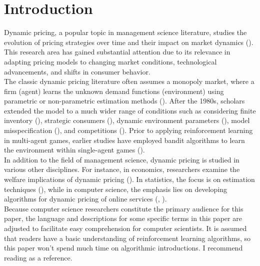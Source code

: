 \documentclass[12pt]{article}
\begin{document}
\section{Introduction}

Dynamic pricing, a popular topic in management science literature, studies the evolution of pricing strategies over time and their impact on market dynamics (\cite{den2015dynamic}). This research area has gained substantial attention due to its relevance in adapting pricing models to changing market conditions, technological advancements, and shifts in consumer behavior. \\

The classic dynamic pricing literature often assumes a monopoly market, where a firm (agent) learns the unknown demand functions (environment) using parametric or non-parametric estimation methods (\cite{robinson1975dynamic}). After the 1980s, scholars extended the model to a much wider range of conditions such as considering finite inventory (\cite{varian1980model}), strategic consumers (\cite{levin2009dynamic}), dynamic environment parameters (\cite{keskin2022data}), model misspecification (\cite{besbes2015surprising}), and competitions (\cite{gallego2014dynamic}). Prior to applying reinforcement learning in multi-agent games, earlier studies have employed bandit algorithms to learn the environment within single-agent games (\cite{misra2019dynamic}).\\

In addition to the field of management science, dynamic pricing is studied in various other disciplines. For instance, in economics, researchers examine the welfare implications of dynamic pricing (\cite{williams2022welfare}). In statistics, the focus is on estimation techniques (\cite{bertsimas2006dynamic}), while in computer science, the emphasis lies on developing algorithms for dynamic pricing of online services (\cite{ho2013adaptive}, \cite{markgraf2023safe}). \\

Because computer science researchers constitute the primary audience for this paper, the language and descriptions for some specific terms in this paper are adjusted to facilitate easy comprehension for computer scientists. It is assumed that readers have a basic understanding of reinforcement learning algorithms, so this paper won't spend much time on algorithmic introductions. I recommend reading \cite{sutton2018reinforcement} as a reference.\\
\end{document}
